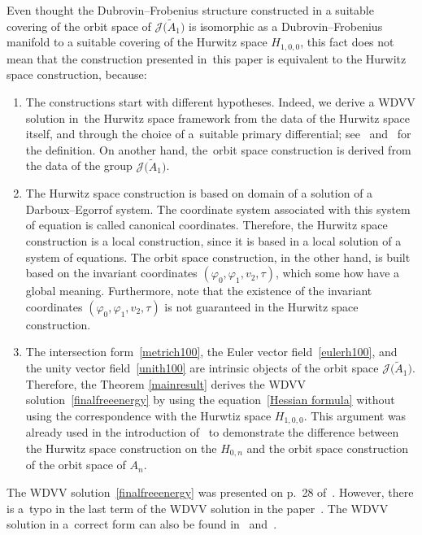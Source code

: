 \documentclass[pdftex]{sigma}%
\numberwithin{equation}{section}
\newcommand{\Ja}{\mathcal{J}}
\begin{document}
\begin{Remark}
Even thought the Dubrovin--Frobenius structure constructed in a suitable covering of the orbit space of $\Ja\big(\tilde A_1\big)$ is isomorphic as a Dubrovin--Frobenius manifold to a suitable covering of the Hurwitz space $H_{1,0,0}$, this fact does not mean that the construction presented in~this paper is equivalent to the Hurwitz space construction, because:
\begin{enumerate}\itemsep=0pt
\item The constructions start with different hypotheses. Indeed, we derive a WDVV solution in~the Hurwitz space framework from the data of the Hurwitz space itself, and through the choice of a~suitable primary differential; see~\cite{B.Dubrovin2} and~\cite{V.Shramchenko} for the definition. On another hand, the~orbit space construction is derived from the data of the group $\Ja\big(\tilde A_1\big)$.
\item The Hurwitz space construction is based on domain of a solution of a Darboux--Egorrof system. The coordinate system associated with this system of equation is called canonical coordinates. Therefore, the Hurwitz space construction is a local construction, since it is based in a local solution of a system of equations. The orbit space construction, in the other hand, is built based on the invariant coordinates $(\varphi_0,\varphi_1, v_2, \tau)$, which some how have a global meaning. Furthermore, note that the existence of the invariant coordinates $(\varphi_0,\varphi_1, v_2, \tau)$ is not guaranteed in the Hurwitz space construction.
\item The intersection form~\eqref{metrich100}, the Euler vector field~\eqref{eulerh100}, and the unity vector field~\eqref{unith100} are intrinsic objects of the orbit space $\Ja\big(\tilde A_1\big)$. Therefore, the Theorem \ref{mainresult} derives the WDVV solution~\eqref{finalfreeenergy} by using the equation~\eqref{Hessian formula} without using the correspondence with the Hurwtiz space $H_{1,0,0}$. This argument was already used in the introduction of~\cite{B.Dubrovin1} to demonstrate the difference between the Hurwitz space construction on the $H_{0,n}$ and the orbit space construction of the orbit space of $A_n$.
\end{enumerate}
\end{Remark}

\begin{Remark}
The WDVV solution~\eqref{finalfreeenergy} was presented on p.~28 of~\cite{Dubrovin3}. However, there is a~typo in the last term of the WDVV solution in the paper~\cite{Dubrovin3}. The WDVV solution in a~correct form can also be found in~\cite{M.CutimancoandV.Shramchenko} and~\cite{E.V.FerapontovM.V.PavlovL.Xue}.
\end{Remark}
\end{document}

